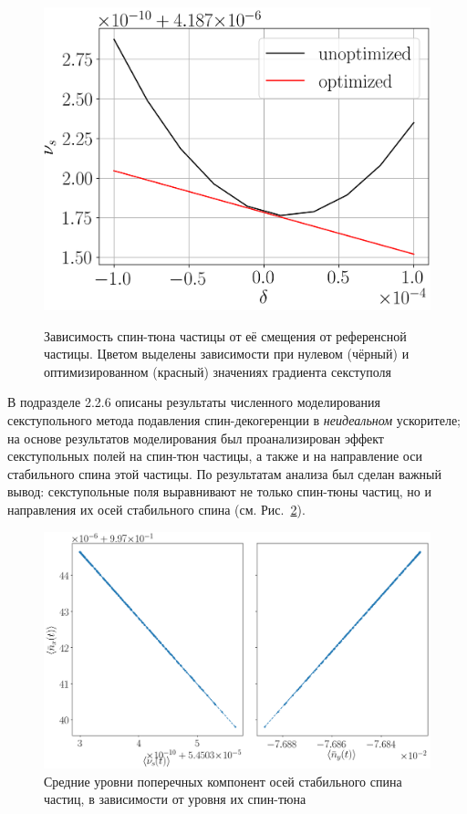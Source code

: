 \begin{figure}[H]
\begin{minipage}{.5\linewidth}
{		\includegraphics[height=.2\paperheight]{images/decoh_sim/spin_tune_decoh_d_offset_1}}
	\end{minipage}%
	\begin{minipage}{.5\linewidth}
	\caption{Зависимость спин-тюна частицы от её смещения от референсной частицы.\label{fig:decoh:perfect}
	Цветом выделены зависимости при нулевом (чёрный) и оптимизированном (красный) значениях градиента секступоля}
	\end{minipage}
\end{figure}

В подразделе 2.2.6 описаны результаты численного моделирования секступольного метода 
подавления спин-декогеренции в \emph{неидеальном} ускорителе; 
на основе результатов моделирования был проанализирован
эффект секступольных полей на спин-тюн частицы, а также и на направление оси стабильного спина этой частицы. 
По результатам анализа был сделан важный вывод: секступольные поля выравнивают не только спин-тюны
частиц, но и направления их осей стабильного спина (см. Рис.~\ref{decoh:fig:nbar_vs_ST}).

\begin{figure}[H]\centering
	\includegraphics[height=.3\paperheight]{images/decoh_sim/mean_n_bar_vs_spin_tune}
	\caption{Средние уровни поперечных компонент осей стабильного спина частиц, в зависимости от уровня их спин-тюна\label{decoh:fig:nbar_vs_ST}}
\end{figure}

